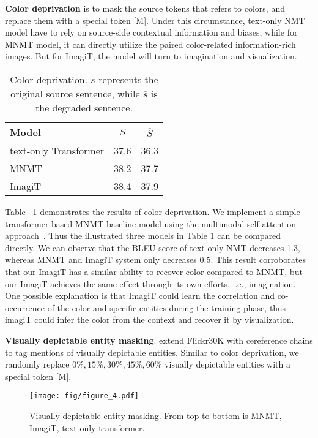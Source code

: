 \documentclass[11pt]{article}
\newcommand{\method}{ImagiT\xspace}
\begin{document}
\textbf{Color deprivation} is to mask the source tokens that refers to colors, and replace them with a special token [M]. Under this circumstance, text-only NMT model have to rely on source-side contextual information and biases, while for MNMT model, it can directly utilize the paired color-related information-rich images. But for \method, the model will turn to imagination and visualization.

\begin{table}[!h]
\centering
\begin{tabular}{l|cc}
\hline
 Model             & $S$     & $\overline{S}$    \\ \hline
text-only Transformer & 37.6  & 36.3 \\ \hline
MNMT        & 38.2 & 37.7 \\ \hline
\method       & 38.4 & 37.9 \\
\hline
\end{tabular}
\caption{Color deprivation. $s$ represents the original source sentence, while $\overline{s}$ is the degraded sentence.}
\label{color deprivation}
\end{table}

Table ~\ref{color deprivation} demonstrates the results of color deprivation. We implement a simple transformer-based MNMT baseline model using the multimodal self-attention approach~\cite{yao2020multimodal}. Thus the illustrated three models in Table \ref{color deprivation} can be compared directly. We can observe that the BLEU score of text-only NMT decreases 1.3, whereas MNMT and \method system only decreases 0.5. This result corroborates that our \method has a similar ability to recover color compared to MNMT, but our \method achieves the same effect through its own efforts, i.e., imagination. One possible explanation is that \method could learn the correlation and co-occurrence of the color and specific entities during the training phase, thus imagiT could infer the color from the context and recover it by visualization.

\textbf{Visually depictable entity masking}. \citet{plummer2015flickr30k} extend Flickr30K with cereference chains to tag mentions of visually depictable entities. Similar to color deprivation, we randomly replace $0\%,15\%,30\%,45\%,60\%$ visually depictable entities with a special token [M].

\begin{figure}[ht]
\centering
\texttt{[image: fig/figure\_4.pdf]} \caption{Visually depictable entity masking. From top to bottom is MNMT, \method, text-only transformer.}
\label{fig4}
\end{figure}
\end{document}
